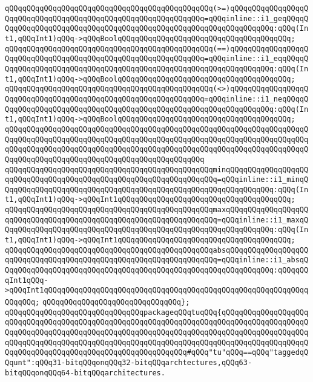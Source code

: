 \verb|qQQqqQQqqQQqqQQqqQQqqQQqqQQqqQQqqQQqqQQqqQQqqQQq(>=)qQQqqQQqqQQqqQQqqQQqqQQqqQQqqQQqqQQqqQQqqQQqqQQqqQQqqQQqqQQqqQQq=qQQqinline::i1_geqQQqqQQqqQQqqQQqqQQqqQQqqQQqqQQqqQQqqQQqqQQqqQQqqQQqqQQqqQQqqQQqqQQq:qQQq(Int1,qQQqInt1)qQQq->qQQqBoolqQQqqQQqqQQqqQQqqQQqqQQqqQQqqQQqqQQqqQQq;|\newline
\verb|qQQqqQQqqQQqqQQqqQQqqQQqqQQqqQQqqQQqqQQqqQQqqQQq(==)qQQqqQQqqQQqqQQqqQQqqQQqqQQqqQQqqQQqqQQqqQQqqQQqqQQqqQQqqQQqqQQq=qQQqinline::i1_eqqQQqqQQqqQQqqQQqqQQqqQQqqQQqqQQqqQQqqQQqqQQqqQQqqQQqqQQqqQQqqQQqqQQq:qQQq(Int1,qQQqInt1)qQQq->qQQqBoolqQQqqQQqqQQqqQQqqQQqqQQqqQQqqQQqqQQqqQQq;|\newline
\verb|qQQqqQQqqQQqqQQqqQQqqQQqqQQqqQQqqQQqqQQqqQQqqQQq(<>)qQQqqQQqqQQqqQQqqQQqqQQqqQQqqQQqqQQqqQQqqQQqqQQqqQQqqQQqqQQqqQQq=qQQqinline::i1_neqQQqqQQqqQQqqQQqqQQqqQQqqQQqqQQqqQQqqQQqqQQqqQQqqQQqqQQqqQQqqQQqqQQq:qQQq(Int1,qQQqInt1)qQQq->qQQqBoolqQQqqQQqqQQqqQQqqQQqqQQqqQQqqQQqqQQqqQQq;|\newline
\verb|qQQqqQQqqQQqqQQqqQQqqQQqqQQqqQQqqQQqqQQqqQQqqQQqqQQqqQQqqQQqqQQqqQQqqQQqqQQqqQQqqQQqqQQqqQQqqQQqqQQqqQQqqQQqqQQqqQQqqQQqqQQqqQQqqQQqqQQqqQQqqQQqqQQqqQQqqQQqqQQqqQQqqQQqqQQqqQQqqQQqqQQqqQQqqQQqqQQqqQQqqQQqqQQqqQQqqQQqqQQqqQQqqQQqqQQqqQQqqQQqqQQqqQQqqQQqqQQq|\newline
\verb|qQQqqQQqqQQqqQQqqQQqqQQqqQQqqQQqqQQqqQQqqQQqqQQqminqQQqqQQqqQQqqQQqqQQqqQQqqQQqqQQqqQQqqQQqqQQqqQQqqQQqqQQqqQQqqQQqqQQq=qQQqinline::i1_minqQQqqQQqqQQqqQQqqQQqqQQqqQQqqQQqqQQqqQQqqQQqqQQqqQQqqQQqqQQqqQQq:qQQq(Int1,qQQqInt1)qQQq->qQQqInt1qQQqqQQqqQQqqQQqqQQqqQQqqQQqqQQqqQQqqQQq;|\newline
\verb|qQQqqQQqqQQqqQQqqQQqqQQqqQQqqQQqqQQqqQQqqQQqqQQqmaxqQQqqQQqqQQqqQQqqQQqqQQqqQQqqQQqqQQqqQQqqQQqqQQqqQQqqQQqqQQqqQQqqQQq=qQQqinline::i1_maxqQQqqQQqqQQqqQQqqQQqqQQqqQQqqQQqqQQqqQQqqQQqqQQqqQQqqQQqqQQqqQQq:qQQq(Int1,qQQqInt1)qQQq->qQQqInt1qQQqqQQqqQQqqQQqqQQqqQQqqQQqqQQqqQQqqQQq;|\newline
\verb|qQQqqQQqqQQqqQQqqQQqqQQqqQQqqQQqqQQqqQQqqQQqqQQqabsqQQqqQQqqQQqqQQqqQQqqQQqqQQqqQQqqQQqqQQqqQQqqQQqqQQqqQQqqQQqqQQqqQQq=qQQqinline::i1_absqQQqqQQqqQQqqQQqqQQqqQQqqQQqqQQqqQQqqQQqqQQqqQQqqQQqqQQqqQQqqQQq:qQQqqQQqInt1qQQq->qQQqInt1qQQqqQQqqQQqqQQqqQQqqQQqqQQqqQQqqQQqqQQqqQQqqQQqqQQqqQQqqQQqqQQqqQQq;|\newline
\verb|qQQqqQQqqQQqqQQqqQQqqQQqqQQqqQQq};|\newline
\newline
\verb|qQQqqQQqqQQqqQQqqQQqqQQqqQQqqQQqpackageqQQqtuqQQq{qQQqqQQqqQQqqQQqqQQqqQQqqQQqqQQqqQQqqQQqqQQqqQQqqQQqqQQqqQQqqQQqqQQqqQQqqQQqqQQqqQQqqQQqqQQqqQQqqQQqqQQqqQQqqQQqqQQqqQQqqQQqqQQqqQQqqQQqqQQqqQQqqQQqqQQqqQQqqQQqqQQqqQQqqQQqqQQqqQQqqQQqqQQqqQQqqQQqqQQqqQQqqQQqqQQqqQQqqQQqqQQqqQQqqQQqqQQqqQQqqQQqqQQqqQQqqQQqqQQqqQQqqQQqqQQq#qQQq"tu"qQQq==qQQq"taggedqQQqunt":qQQq31-bitqQQqonqQQq32-bitqQQqarchtectures,qQQq63-bitqQQqonqQQq64-bitqQQqarchitectures.|\newline
